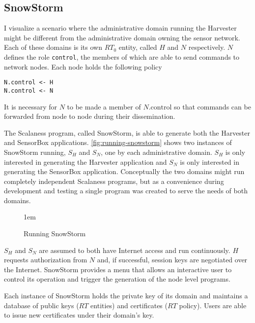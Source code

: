 
\subsection{SnowStorm}


I visualize a scenario where the administrative domain running the Harvester might be different
from the administrative domain owning the sensor network. Each of these domains is its own
$RT_0$ entity, called $H$ and $N$ respectively. $N$ defines the role \texttt{control}, the
members of which are able to send commands to network nodes. Each node holds the following
policy
\begin{Verbatim}
N.control <- H
N.control <- N
\end{Verbatim}

It is necessary for $N$ to be made a member of $N.\textrm{control}$ so that commands can be
forwarded from node to node during their dissemination. 

The Scalaness program, called SnowStorm, is able to generate both the Harvester and SensorBox
applications. \autoref{fig:running-snowstorm} shows two instances of SnowStorm running, $S_H$
and $S_N$, one by each administrative domain. $S_H$ is only interested in generating the
Harvester application and $S_N$ is only interested in generating the SensorBox application.
Conceptually the two domains might run completely independent Scalaness programs, but as a
convenience during development and testing a single program was created to serve the needs of
both domains.

\begin{figure}[htbp]
  
  \centerline{\raise 1em\box\graph}
  \caption{Running SnowStorm}
  \label{fig:running-snowstorm}
\end{figure}

$S_H$ and $S_N$ are assumed to both have Internet access and run continuously. $H$ requests
authorization from $N$ and, if successful, session keys are negotiated over the Internet.
SnowStorm provides a menu that allows an interactive user to control its operation and trigger
the generation of the node level programs.

Each instance of SnowStorm holds the private key of its domain and maintains a database of
public keys ($RT$ entities) and certificates ($RT$ policy). Users are able to issue new
certificates under their domain's key.



